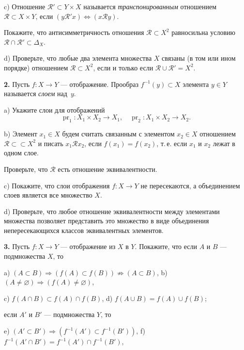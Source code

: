 c) Отношение $\mathscr{R}' \subset Y \times X$ называется \textit{транспонированным} отношением $\mathscr{R} \subset X \times Y$,
если $(y \mathrel{\mathscr{R}'} x) \Leftrightarrow (x \mathrel{\mathscr{R}} y)$.

Покажите, что антисимметричность отношения $\mathscr{R} \subset X^2$ равносильна условию
$\mathscr{R} \cap \mathscr{R}' \subset \Delta_X$.

d) Проверьте, что любые два элемента множества $X$ связаны (в том или ином
порядке) отношением $\mathscr{R} \subset X^2$, если и только если $\mathscr{R} \cup \mathscr{R}' = X^2$.

\medskip

\textbf{2.} Пусть $f \colon X \to Y$ --- отображение. Прообраз $f^{-1}(y) \subset X$ элемента $y \in Y$ называется
\textit{слоем} над~$y$.

a) Укажите слои для отображений
\[
  \operatorname{pr}_1 \colon X_1 \times X_2 \to X_1, \quad \operatorname{pr}_2 \colon X_1 \times X_2 \to X_2.
\]

b) Элемент $x_1 \in X$ будем считать связанным с элементом $x_2 \in X$ отношением $\mathscr{R} \subset
{} \subset X^2$ и писать $x_1 \mathrel{\mathscr{R}} x_2$, если $f(x_1) = f(x_2)$, т.\,е. если $x_1$ и $x_2$ лежат в одном слое.

Проверьте, что $\mathscr{R}$ есть отношение эквивалентности.

c) Покажите, что слои отображения $f \colon X \to Y$ не пересекаются, а объединением
слоев является все множество $X$.

d) Проверьте, что любое отношение эквивалентности между элементами множества позволяет представить это множество в виде объединения непересекающихся
классов эквивалентных элементов.

\medskip

\textbf{3.} Пусть $f \colon X \to Y$ --- отображение из $X$ в $Y$. Покажите, что если $A$ и $B$ --- подмножества $X$, то

a) $(A \subset B) \Rightarrow (f(A) \subset f(B)) \not\Rightarrow (A \subset B)$, \quad b) $(A \neq \varnothing) \Rightarrow (f(A) \neq \varnothing)$,

c) $f(A \cap B) \subset f(A) \cap f(B)$, \qquad d) $f(A \cup B) = f(A) \cup f(B)$;

если $A'$ и $B'$ --- подмножества $Y$, то

e) $(A' \subset B') \Rightarrow (f^{-1}(A') \subset f^{-1}(B'))$, \qquad f) $f^{-1}(A' \cap B') = f^{-1}(A') \cap f^{-1}(B')$,

